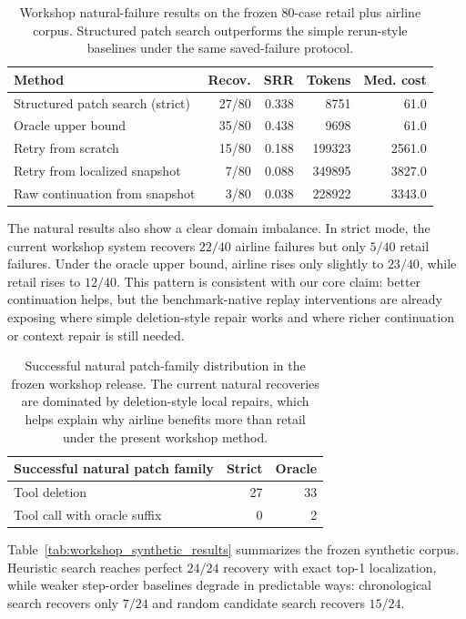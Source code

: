 \documentclass[11pt]{article}
\begin{document}
\begin{table}[t]
\centering
\small
\begin{tabular}{lrrrr}
\toprule
Method & Recov. & SRR & Tokens & Med. cost \\
\midrule
Structured patch search (strict) & 27/80 & 0.338 & 8751 & 61.0 \\
Oracle upper bound & 35/80 & 0.438 & 9698 & 61.0 \\
Retry from scratch & 15/80 & 0.188 & 199323 & 2561.0 \\
Retry from localized snapshot & 7/80 & 0.088 & 349895 & 3827.0 \\
Raw continuation from snapshot & 3/80 & 0.038 & 228922 & 3343.0 \\
\bottomrule
\end{tabular}
\caption{Workshop natural-failure results on the frozen $80$-case retail plus
airline corpus. Structured patch search outperforms the simple rerun-style
baselines under the same saved-failure protocol.}
\label{tab:workshop_natural_results}
\end{table}

The natural results also show a clear domain imbalance. In strict mode, the
current workshop system recovers $22/40$ airline failures but only $5/40$
retail failures. Under the oracle upper bound, airline rises only slightly to
$23/40$, while retail rises to $12/40$. This pattern is consistent with our
core claim: better continuation helps, but the benchmark-native replay
interventions are already exposing where simple deletion-style repair works and
where richer continuation or context repair is still needed.

\begin{table}[t]
\centering
\small
\begin{tabular}{lrr}
\toprule
Successful natural patch family & Strict & Oracle \\
\midrule
Tool deletion & 27 & 33 \\
Tool call with oracle suffix & 0 & 2 \\
\bottomrule
\end{tabular}
\caption{Successful natural patch-family distribution in the frozen workshop
release. The current natural recoveries are dominated by deletion-style local
repairs, which helps explain why airline benefits more than retail under the
present workshop method.}
\label{tab:workshop_patch_families}
\end{table}

Table~\ref{tab:workshop_synthetic_results} summarizes the frozen synthetic
corpus. Heuristic search reaches perfect $24/24$ recovery with exact top-1
localization, while weaker step-order baselines degrade in predictable ways:
chronological search recovers only $7/24$ and random candidate search recovers
$15/24$.
\end{document}
